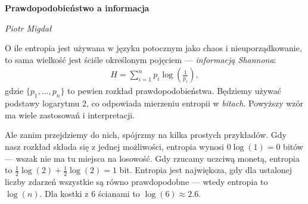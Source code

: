 \documentclass[10pt,a4paper]{article}
\begin{document}
\noindent\textbf{\LARGE Prawdopodobieństwo a informacja}

\medskip
\noindent\textit{\Large Piotr Migdał}

\medskip

O ile entropia jest używana w języku potocznym jako chaos i nieuporządkowanie, to sama wielkość jest ściśle określonym pojęciem --- \emph{informacją Shannona}:
%
%
\begin{align}
    H = \sum_{i=1}^{n} p_i \log \left(\tfrac{1}{p_i} \right),\label{eq:entropia}
\end{align}
%
%
gdzie $\{p_1, \ldots, p_n\}$ to pewien rozkład prawdopodobieństwa.
Będziemy używać podstawy logarytmu $2$, co odpowiada mierzeniu entropii w \emph{bitach}.
Powyższy wzór ma wiele zastosowań i interpretacji.

Ale zanim przejdziemy do nich, spójrzmy na kilka prostych przykładów.
Gdy nasz rozkład składa się z jednej możliwości, entropia wynosi $0 \log(1) = 0$ bitów --- wszak nie ma tu miejsca na losowość.
Gdy rzucamy uczciwą monetą, entropia to $\tfrac{1}{2} \log(2) + \tfrac{1}{2} \log(2) = 1$ bit.
Entropia jest największa, gdy dla ustalonej liczby zdarzeń wszystkie są równo prawdopodobne --- wtedy entropia to $\log(n)$.
Dla kostki z $6$ ścianami to $\log(6)\approx 2.6$. 

\end{document}
